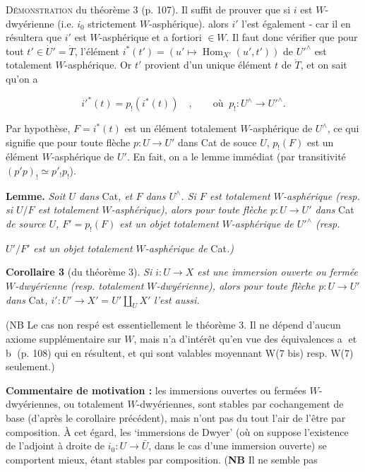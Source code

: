 \documentclass[11pt]{article}
\newcommand{\msp}[1]{\marginpar{\footnotesize [#1]}}
\begin{document}
\textsc{Démonstration} du théorème 3 (p. 107). Il suffit de prouver que si $i$ est $W$-dwyérienne (i.e. $i_0$ strictement $W$-asphérique). alors $i'$ l'est également - car il en résultera que $i'$ est $W$-asphérique et a fortiori $\in W$. Il faut donc vérifier que pour tout $t'\in\dot{U}'=\dot{T}$, l'élément $i^*(t')=(u'\longmapsto\operatorname{Hom}_{X'}(u',t'))$ de $U'^\wedge$ est totalement $W$-asphérique. Or $t'$ provient d'un unique élément $t$ de $\dot{T}$, et on sait qu'on a %

\[ i'^*(t)=p_!(i^*(t))\quad,\qquad\text{où }\ p_!:U^\wedge\longrightarrow U'^\wedge. \]

Par hypothèse, $F=i^*(t)$ est un élément totalement $W$-asphérique de $U^\wedge$, ce qui signifie que pour toute flèche $p:U\longrightarrow U'$ dans Cat de souce $U$, $p_!(F)$ est un élément $W$-asphérique de $U'$. En fait, on a le lemme immédiat (par transitivité $(p'p)_!\simeq p'_!p_!$). %

\textbf{Lemme.} \textit{Soit $U$ dans} Cat\textit{, et $F$ dans $U^\wedge$. Si $F$ est totalement $W$-asphérique (resp. si $U/F$ est totalement $W$-asphérique), alors pour toute flèche $p:U\longrightarrow U'$ dans} Cat \textit{de source $U$, $F'=p_!(F)$ est un objet totalement $W$-asphérique de $U'^\wedge$ (resp.}

\msp{page 113}

\textit{$U'/F'$ est un objet totalement $W$-asphérique de} Cat\textit{.)}

\textbf{Corollaire 3} (du théorème 3). \textit{Si $i:U\longrightarrow X$ est une immersion ouverte ou fermée $W$-dwyérienne (resp. totalement $W$-dwyérienne), alors pour toute flèche $p:U\longrightarrow U'$ dans} Cat\textit{, $i':U'\longrightarrow X'=U'\amalg_U X'$} \textit{l'est aussi.}

(NB Le cas non respé est essentiellement le théorème 3. Il ne dépend d'aucun axiome supplémentaire sur $W$, mais n'a d'intérêt qu'en vue des équivalences \textcircled{a} et \textcircled{b} (p. 108) qui en résultent, et qui sont valables moyennant W(7 bis) resp. W(7) seulement.)

\textbf{Commentaire de motivation :} les immersions ouvertes ou fermées $W$-dwyériennes, ou totalement $W$-dwyériennes, sont stables par cochangement de base (d'après le corollaire précédent), mais n'ont pas du tout l'air de l'être par composition. À cet égard, les `immersions de Dwyer' (où on suppose l'existence de l'adjoint à droite de $i_0:U\longrightarrow\bar{U}$, dans le cas d'une immersion ouverte) se comportent mieux, étant stables par composition. (\textbf{NB} Il ne semble pas
\end{document}
